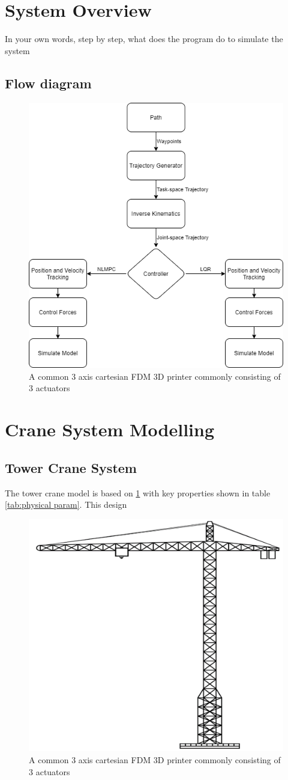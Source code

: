 \documentclass{UoNMCHA}
\numberwithin{equation}{section}
\begin{document}
\section{System Overview}
In your own words, step by step, what does the program do to simulate the system

\subsection{Flow diagram}

\begin{figure}[H]
	\begin{center}
		\includegraphics[width=.5\linewidth]{figs/Picture4}
		\caption{A  common 3 axis cartesian FDM 3D printer commonly consisting of 3 actuators}
		\label{figs/Picture4}
	\end{center}
\end{figure}

\section{Crane System Modelling}

\subsection{Tower Crane System}
The tower crane model is based on \ref{figs/Picture4} with key properties shown in table \ref{tab:physical param}. This design

\begin{figure}[H]
	\begin{center}
		\includegraphics[width=.5\linewidth]{figs/Picture5}
		\caption{A  common 3 axis cartesian FDM 3D printer commonly consisting of 3 actuators}
		\label{figs/Picture5}
	\end{center}
\end{figure}
\end{document}
